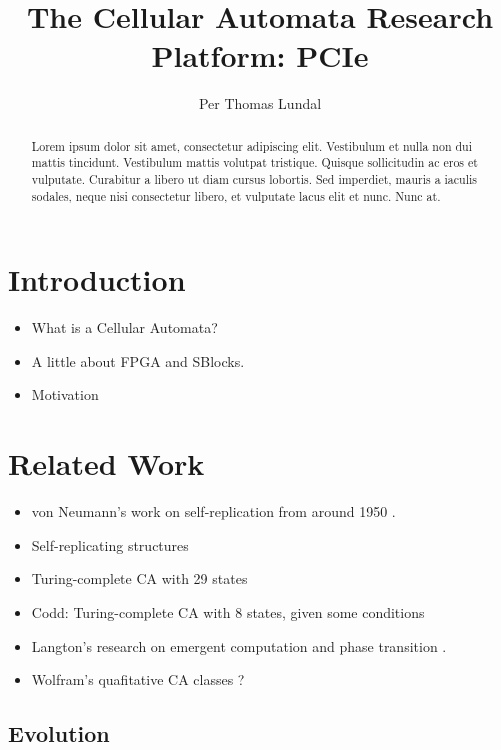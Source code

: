 \documentclass[a4paper]{IEEEtran}
\title{The Cellular Automata Research Platform: PCIe}
\author{Per Thomas Lundal}
\begin{document}
\maketitle

\begin{abstract}

Lorem ipsum dolor sit amet, consectetur adipiscing elit. Vestibulum et nulla non dui mattis tincidunt. Vestibulum mattis volutpat tristique. Quisque sollicitudin ac eros et vulputate. Curabitur a libero ut diam cursus lobortis. Sed imperdiet, mauris a iaculis sodales, neque nisi consectetur libero, et vulputate lacus elit et nunc. Nunc at.

\end{abstract}

\section{Introduction}

\begin{itemize}
    \item What is a Cellular Automata?
    \item A little about FPGA and SBlocks.
    \item Motivation
\end{itemize}

\section{Related Work}

\begin{itemize}
    \item von Neumann's work on self-replication from around 1950 \cite{neumann1966selfreplication}.
    \item Self-replicating structures \cite{reggia1998neumann}
    \item Turing-complete CA with 29 states
    \item Codd: Turing-complete CA with 8 states, given some conditions \cite{codd1968cellular}
    \item Langton's research on emergent computation and phase transition \cite{langton1990edgeofchaos}.
    \item Wolfram's quafitative CA classes \cite{wolfram1984complexity}?

\end{itemize}

\subsection{Evolution}
\end{document}

